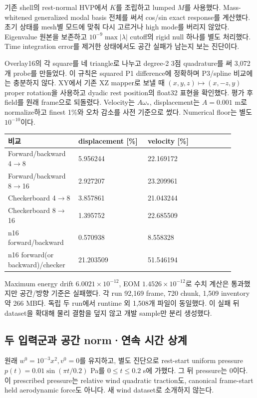 \documentclass[10pt]{article}
\begin{document}
기존 shell의 rest-normal HVP에서 \(K\)를 조립하고 lumped \(M\)를 사용했다.
Mass-whitened generalized modal basis 전체를 써서 cos/sin exact response를 계산했다.
초기 상태를 mesh별 모드에 맞춰 다시 고르거나 high mode를 버리지 않았다.
Eigenvalue 원본을 보존하고 \(10^{-9}\max|\lambda|\) cutoff의 rigid null 하나를 별도 처리했다.
Time integration error를 제거한 상태에서도 공간 실패가 남는지 보는 진단이다.

Overlay16의 각 square를 네 triangle로 나누고 degree-2 3점 quadrature를 써 3,072개 probe를 만들었다.
이 규칙은 squared P1 difference에 정확하며 P3/spline 비교에는 충분하지 않다.
XY에서 기존 XZ mapper로 보낼 때 \((x,y,z)\mapsto(x,-z,y)\) proper rotation을 사용하고
dyadic rest position의 float32 표현을 확인했다. 평가 후 field를 원래 frame으로 되돌렸다.
Velocity는 \(A\omega_*\), displacement는 \(A=0.001\) m로 normalize하고 finest 1\%와
오차 감소를 사전 기준으로 썼다. Numerical floor는 별도 \(10^{-10}\)이다.

\begin{longtable}{L{0.27\linewidth}L{0.28\linewidth}L{0.35\linewidth}}
\toprule 비교 & displacement [\%] & velocity [\%]\\\midrule
Forward/backward 4$\to$8 & 5.956244 & 22.169172\\
Forward/backward 8$\to$16 & 2.927207 & 23.209961\\
Checkerboard 4$\to$8 & 3.857861 & 21.043244\\
Checkerboard 8$\to$16 & 1.395752 & 22.685509\\
n16 forward/backward & 0.570938 & 8.558328\\
n16 forward(or backward)/checker & 21.203509 & 51.546194\\
\bottomrule\end{longtable}

Maximum energy drift \(6.0021\times10^{-12}\), EOM \(1.4526\times10^{-12}\)로
수치 계산은 통과했지만 공간/방향 기준은 실패했다. 각 run 92,169 frame, 720 chunk,
1,509 inventory 약 266 MB다. 독립 두 run에서 runtime 외 1,508개 파일이 동일했다.
이 실패 뒤 dataset을 확대해 물리 결함을 덮지 않고 개발 sample만 분리 생성했다.

\subsection{두 입력군과 공간 norm·연속 시간 상계}
\label{sec:r1-pressure-comparison}

원래 \(w^0=10^{-3}x^2,v^0=0\)를 유지하고, 별도 진단으로 rest-start uniform pressure
\(p(t)=0.01\sin(\pi t/0.2)\) Pa를 \(0\le t\le0.2\) s에 가했다.
그 뒤 pressure는 0이다. 이 prescribed pressure는 relative wind quadratic traction도,
canonical frame-start held aerodynamic force도 아니다. 새 wind dataset로 소개하지 않는다.
\end{document}
